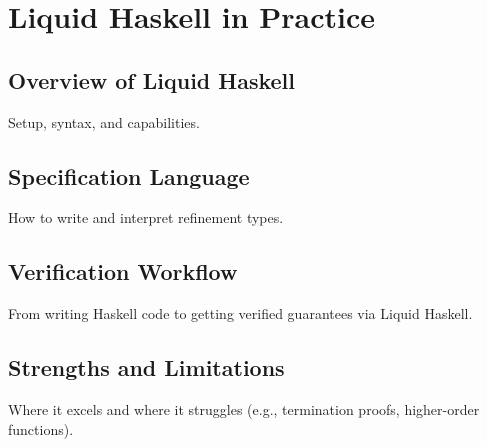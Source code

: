 \chapter { Liquid Haskell in Practice }
\section { Overview of Liquid Haskell }
Setup, syntax, and capabilities.

\section { Specification Language }
How to write and interpret refinement types.

\section { Verification Workflow }
From writing Haskell code to getting verified guarantees via Liquid Haskell.

\section { Strengths and Limitations }
Where it excels and where it struggles (e.g., termination proofs, higher-order functions).
